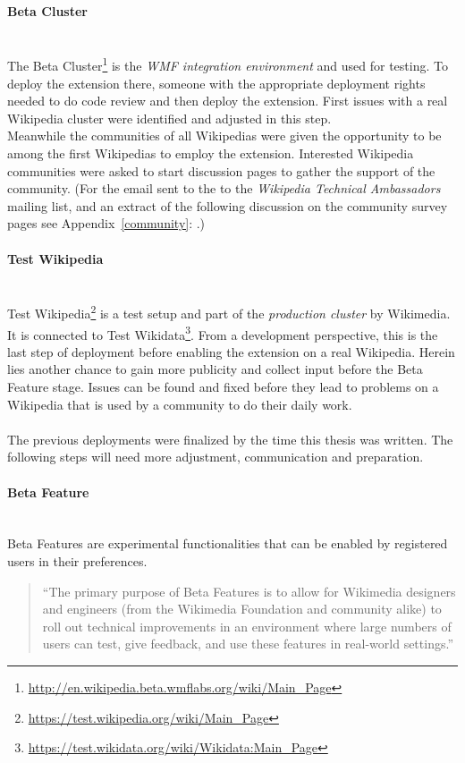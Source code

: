 \paragraph{Beta Cluster} ~\\
The Beta Cluster\footnote{\url{http://en.wikipedia.beta.wmflabs.org/wiki/Main_Page}} is the \textit{WMF integration environment} and used for testing. To deploy the extension there, someone with the appropriate deployment rights needed to do code review and then deploy the extension. First issues with a real Wikipedia cluster were identified and adjusted in this step. \\
Meanwhile the communities of all Wikipedias were given the opportunity to be among the first Wikipedias to employ the extension. Interested Wikipedia communities were asked to start discussion pages to gather the support of the community. (For the email sent to the to the \textit{Wikipedia Technical Ambassadors} mailing list, and an extract of the following discussion on the community survey pages see Appendix~\ref{community}: .)

\paragraph{Test Wikipedia} ~\\
Test Wikipedia\footnote{\url{https://test.wikipedia.org/wiki/Main_Page}} is a test setup and part of the \textit{production cluster} by Wikimedia. It is connected to Test Wikidata\footnote{\url{https://test.wikidata.org/wiki/Wikidata:Main_Page}}. From a development perspective, this is the last step of deployment before enabling the extension on a real Wikipedia. Herein lies another chance to gain more publicity and collect input before the Beta Feature stage. Issues can be found and fixed before they lead to problems on a Wikipedia that is used by a community to do their daily work. \\
\\
The previous deployments were finalized by the time this thesis was written. The following steps will need more adjustment, communication and preparation.

\paragraph{Beta Feature} ~\\
Beta Features are experimental functionalities that can be enabled by registered users in their preferences. 
\begin{quotation}
\noindent``The primary purpose of Beta Features is to allow for Wikimedia designers and engineers (from the Wikimedia Foundation and community alike) to roll out technical improvements in an environment where large numbers of users can test, give feedback, and use these features in real-world settings.'' \citep{wiki:04}
\end{quotation} 


